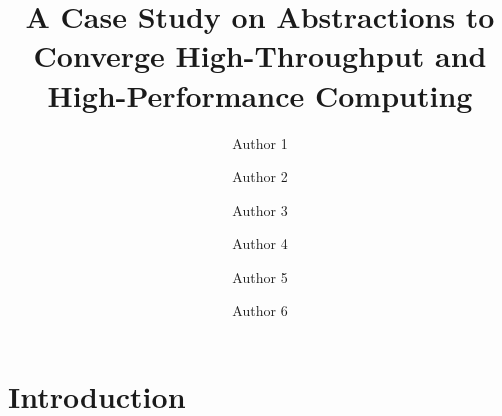 \documentclass[sigconf, screen]{acmart}
\begin{document}
\title{A Case Study on Abstractions to Converge High-Throughput and High-Performance Computing}

\author{Author 1}

\author{Author 2}

\author{Author 3}

\author{Author 4}

\author{Author 5}

\author{Author 6}

\renewcommand{\shortauthors}{Author 1 et al.}

\begin{abstract}

\end{abstract}

%
%
\begin{CCSXML}
\end{CCSXML}



\maketitle

\section{Introduction}
\label{sec:intro}


\end{document}
